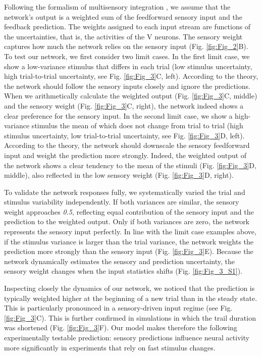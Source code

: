 \documentclass[10pt,a4paper]{article}
\begin{document}
Following the formalism of multisensory integration \citep[see, e.g.][]{pouget2013probabilistic}, we assume that the network's output is a weighted sum of the feedforward sensory input and the feedback prediction. The weights assigned to each input stream are functions of the uncertainties, that is, the activities of the V neurons. The sensory weight captures how much the network relies on the sensory input (Fig. \ref{fig:Fig_2}B). To test our network, we first consider two limit cases. In the first limit case, we show a low-variance stimulus that differs in each trial (low stimulus uncertainty, high trial-to-trial uncertainty, see Fig. \ref{fig:Fig_3}C, left). According to the theory, the network should follow the sensory inputs closely and ignore the predictions. When we arithmetically calculate the weighted output (Fig. \ref{fig:Fig_3}C, middle) and the sensory weight (Fig. \ref{fig:Fig_3}C, right), the network indeed shows a clear preference for the sensory input. In the second limit case, we show a high-variance stimulus the mean of which does not change from trial to trial (high stimulus uncertainty, low trial-to-trial uncertainty, see Fig. \ref{fig:Fig_3}D, left). According to the theory, the network should downscale the sensory feedforward input and weight the prediction more strongly. Indeed, the weighted output of the network shows a clear tendency to the mean of the stimuli (Fig. \ref{fig:Fig_3}D, middle), also reflected in the low sensory weight (Fig. \ref{fig:Fig_3}D, right). 

To validate the network responses fully, we systematically varied the trial and stimulus variability independently. If both variances are similar, the sensory weight approaches \textit{0.5}, reflecting equal contribution of the sensory input and the prediction to the weighted output. Only if both variances are zero, the network represents the sensory input perfectly. In line with the limit case examples above, if the stimulus variance is larger than the trial variance, the network weights the prediction more strongly than the sensory input (Fig. \ref{fig:Fig_3}E). Because the network dynamically estimates the sensory and prediction uncertainty, the sensory weight changes when the input statistics shifts (Fig. \ref{fig:Fig_3_S1}). 

Inspecting closely the dynamics of our network, we noticed that the prediction is typically weighted higher at the beginning of a new trial than in the steady state. This is particularly pronounced in a sensory-driven input regime (see Fig. \ref{fig:Fig_3}C). This is further confirmed in simulations in which the trail duration was shortened (Fig. \ref{fig:Fig_3}F). Our model makes therefore the following experimentally testable prediction: sensory predictions influence neural activity more significantly in experiments that rely on fast stimulus changes. 
\end{document}
